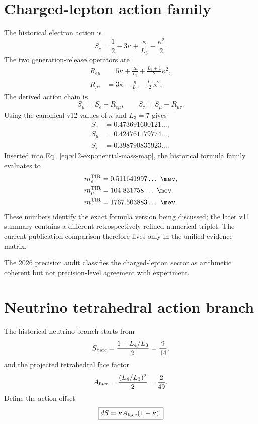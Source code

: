 \section{Charged-lepton action family}
The historical electron action is
\begin{equation}
\boxed{
S_e
=\frac12-3\kappa+\frac{\kappa}{L_3}-\frac{\kappa^2}{2}.
}
\label{eq:v12-electron-action}
\end{equation}
The two generation-release operators are
\begin{align}
R_{e\mu}
&=5\kappa+\frac{2\kappa}{L_3}+\frac{L_3+1}{2}\kappa^2,
\label{eq:v12-electron-muon-release}\\
R_{\mu\tau}
&=3\kappa-\frac{\kappa}{L_3}-\frac{L_3}{2}\kappa^2.
\label{eq:v12-muon-tau-release}
\end{align}
The derived action chain is
\begin{equation}
\boxed{
S_\mu=S_e-R_{e\mu},
\qquad
S_\tau=S_\mu-R_{\mu\tau}.
}
\label{eq:v12-charged-lepton-actions}
\end{equation}
Using the canonical v12 values of $\kappa$ and $L_3=7$ gives
\begin{align}
S_e&=0.473691600121\ldots,\\
S_\mu&=0.424761179774\ldots,\\
S_\tau&=0.398790835923\ldots .
\end{align}
Inserted into Eq.~\eqref{eq:v12-exponential-mass-map}, the historical formula
family evaluates to
\begin{align}
m_e^{\rm TIR}&=0.511641997\ldots\ \mev,\\
m_\mu^{\rm TIR}&=104.831758\ldots\ \mev,\\
m_\tau^{\rm TIR}&=1767.503883\ldots\ \mev.
\end{align}
These numbers identify the exact formula version being discussed; the later
v11 summary contains a different retrospectively refined numerical triplet.
The current publication comparison therefore lives only in the unified evidence
matrix.

The 2026 precision audit classifies the charged-lepton sector as arithmetic
coherent but not precision-level agreement with experiment.

\section{Neutrino tetrahedral action branch}
The historical neutrino branch starts from
\begin{equation}
S_{\rm bare}
=\frac{1+L_4/L_3}{2}
=\frac9{14},
\label{eq:v12-neutrino-bare-action}
\end{equation}
and the projected tetrahedral face factor
\begin{equation}
A_{\rm face}
=\frac{(L_4/L_3)^2}{2}
=\frac2{49}.
\label{eq:v12-neutrino-face-area}
\end{equation}
Define the action offset
\begin{equation}
\boxed{
dS
=\kappa A_{\rm face}(1-\kappa).
}
\label{eq:v12-neutrino-offset}
\end{equation}

